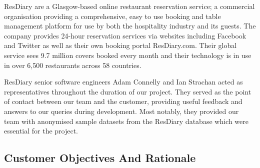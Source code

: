 \documentclass{l3proj}
\begin{document}
ResDiary are a Glasgow-based online restaurant reservation service; a commercial organisation providing a comprehensive, easy to use booking and table management platform for use by both the hospitality industry and its guests. The company provides 24-hour reservation services via websites including Facebook and Twitter as well as their own booking portal ResDiary.com. Their global service sees 9.7 million covers booked every month and their technology is in use in over 6,500 restaurants across 58 countries.

ResDiary senior software engineers Adam Connelly and Ian Strachan acted as representatives throughout the duration of our project. They served as the point of contact between our team and the customer, providing useful feedback and answers to our queries during development. Most notably, they provided our team with anonymised sample datasets from the ResDiary database which were essential for the project.


\subsection{Customer Objectives And Rationale}
\label{custobjectives}


\end{document}
